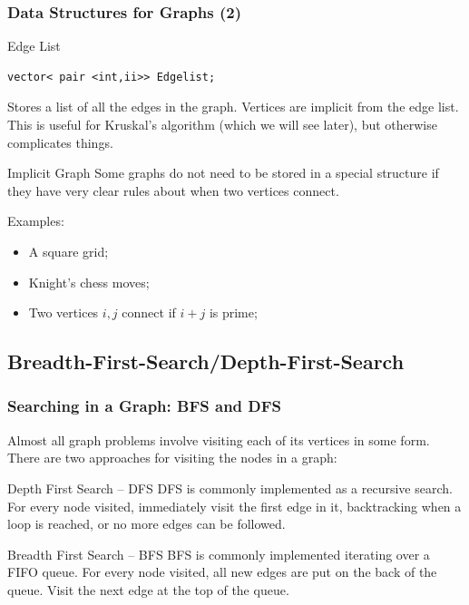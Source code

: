 \documentclass{beamer}
\begin{document}
\begin{frame}
  \frametitle{Data Structures for Graphs (2)}
  {\smaller
    \begin{block}{Edge List}
\begin{verbatim}
vector< pair <int,ii>> Edgelist;
\end{verbatim}

    Stores a list of all the edges in the graph. Vertices are implicit
    from the edge list. This is useful for Kruskal's algorithm (which
    we will see later), but otherwise complicates things.
    \end{block}

    \begin{block}{Implicit Graph}
      Some graphs \alert{do not} need to be stored in a special
      structure if they have very clear rules about when two vertices connect.
      \medskip

      Examples:
      \begin{itemize}
      \item A square grid;
      \item Knight's chess moves;
      \item Two vertices $i,j$ connect if $i+j$ is prime;
      \end{itemize}

    \end{block}
  }
\end{frame}


\subsection{Breadth-First-Search/Depth-First-Search}
\begin{frame}
  \frametitle{Searching in a Graph: BFS and DFS}   
  {\small
  Almost all graph problems involve visiting each of its vertices in
  some form. There are two approaches for visiting the nodes in a graph:

  \begin{block}{Depth First Search -- DFS}
    DFS is commonly implemented as a recursive search. For every node
    visited, immediately visit the first edge in it, backtracking when 
    a loop is reached, or no more edges can be followed.
  \end{block}

  \begin{block}{Breadth First Search -- BFS}
    BFS is commonly implemented iterating over a FIFO queue. For every
    node visited, all new edges are put on the back of the queue. Visit
    the next edge at the top of the queue.
  \end{block}}
\end{frame}
\end{document}
